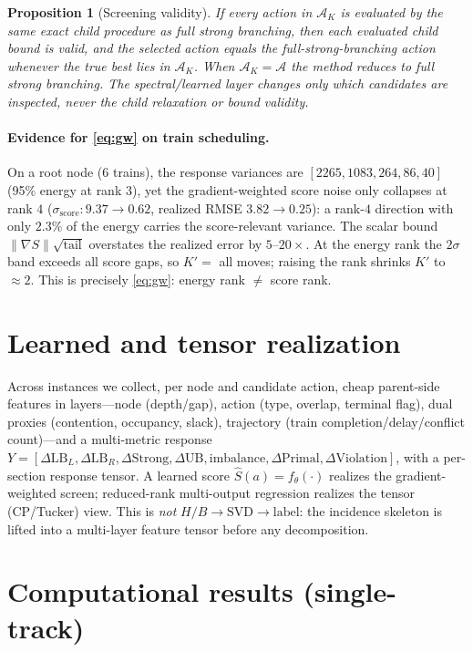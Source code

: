 \documentclass[11pt]{article}
\newtheorem{proposition}{Proposition}
\begin{document}
\begin{proposition}[Screening validity]
If every action in $\mathcal A_K$ is evaluated by the same exact child procedure as full strong
branching, then each evaluated child bound is valid, and the selected action equals the
full-strong-branching action whenever the true best lies in $\mathcal A_K$. When
$\mathcal A_K=\mathcal A$ the method reduces to full strong branching. The spectral/learned layer
changes only which candidates are inspected, never the child relaxation or bound validity.
\end{proposition}

\paragraph{Evidence for \eqref{eq:gw} on train scheduling.} On a root node ($6$ trains), the
response variances are $[2265,1083,264,86,40]$ (95\% energy at rank $3$), yet the
gradient-weighted score noise only collapses at rank $4$ ($\sigma_{\text{score}}:9.37\to0.62$,
realized RMSE $3.82\to0.25$): a rank-$4$ direction with only $2.3\%$ of the energy carries the
score-relevant variance. The scalar bound $\|\nabla S\|\sqrt{\mathrm{tail}}$ overstates the
realized error by $5$--$20\times$. At the energy rank the $2\sigma$ band exceeds all score gaps,
so $K'=$ all moves; raising the rank shrinks $K'$ to $\approx 2$. This is precisely
\eqref{eq:gw}: energy rank $\neq$ score rank.

\section{Learned and tensor realization}\label{sec:learn}
Across instances we collect, per node and candidate action, cheap parent-side features in
layers---node (depth/gap), action (type, overlap, terminal flag), dual proxies (contention,
occupancy, slack), trajectory (train completion/delay/conflict count)---and a multi-metric
response $Y=[\Delta\mathrm{LB}_L,\Delta\mathrm{LB}_R,\Delta\mathrm{Strong},\Delta\mathrm{UB},
\text{imbalance},\Delta\mathrm{Primal},\Delta\mathrm{Violation}]$, with a per-section response
tensor. A learned score $\hat S(a)=f_\theta(\cdot)$ realizes the gradient-weighted screen;
reduced-rank multi-output regression realizes the tensor (CP/Tucker) view. This is \emph{not}
$H/B\to\mathrm{SVD}\to\text{label}$: the incidence skeleton is lifted into a multi-layer
feature tensor before any decomposition.

\section{Computational results (single-track)}\label{sec:exp}
\end{document}
